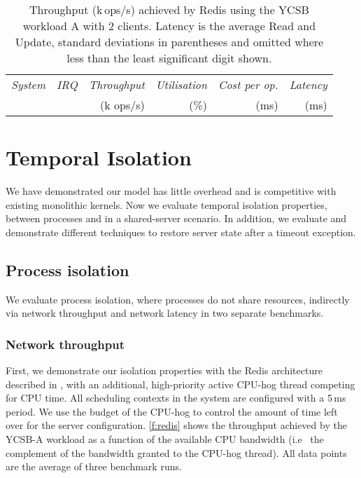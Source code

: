 \begin{table}[t]\centering
      \begin{tabularx}{\textwidth}{Xrrrrr}\toprule
          \emph{System}   & \emph{IRQ} & \emph{Throughput} & \emph{Utilisation} & \emph{Cost per op.} & \emph{Latency} \\
                          &            & (k ops/s)         & (\%)               & (ms) & (ms)            \\
        \midrule

      
      \bottomrule
    \end{tabularx}
    \caption[Results of Redis throughput benchmark.]{Throughput (k\,ops/s) achieved by Redis using the YCSB
      workload A with 2 clients.  Latency is the average Read and Update,
      standard deviations in parentheses and omitted where less than the least
      significant digit shown.}
    \label{t:redis}
\end{table}

\section{Temporal Isolation}

We have demonstrated our model has little overhead and is competitive with existing monolithic
kernels. Now we evaluate temporal isolation properties, between processes and in a shared-server
scenario. 
In addition, we evaluate and demonstrate different
techniques to restore server state after a timeout exception.

\subsection{Process isolation} 

We evaluate process isolation, where processes do not share resources, indirectly via network
throughput and network latency in two separate benchmarks. 
\subsubsection{Network throughput}

First, we demonstrate our isolation properties with the Redis architecture described in
, with an additional, high-priority active CPU-hog thread
competing for \gls{CPU} time.  All scheduling contexts in the system are configured with a
5\,ms period. We use the budget of the CPU-hog to control the amount of time left over
for the server configuration. \autoref{f:redis} shows the throughput
achieved by the YCSB-A workload as a function of the available CPU
bandwidth (i.e \ the complement of the bandwidth granted to the CPU-hog
thread). All data points are the average of three benchmark runs.

